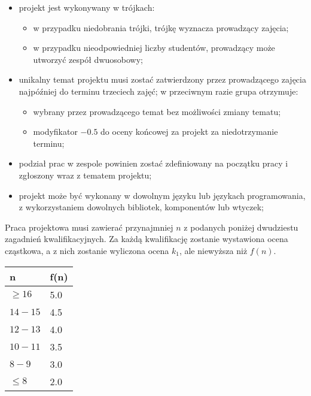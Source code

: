 \documentclass{article}
\renewcommand{\arraystretch}{1.4}
\begin{document}
	\begin{itemize}
		\item projekt jest wykonywany w trójkach:
		\begin{itemize}
			\item w przypadku niedobrania trójki, trójkę wyznacza prowadzący zajęcia;
			\item w przypadku nieodpowiedniej liczby studentów, prowadzący może utworzyć zespół dwuosobowy;
		\end{itemize}
		\item unikalny temat projektu musi zostać zatwierdzony przez prowadzącego zajęcia najpóźniej do terminu trzeciech zajęć; w przeciwnym razie grupa otrzymuje:
		\begin{itemize}
			\item wybrany przez prowadzącego temat bez możliwości zmiany tematu;
			\item modyfikator $-0.5$ do oceny końcowej za projekt za niedotrzymanie terminu;
		\end{itemize}
		\item podział prac w zespole powinien zostać zdefiniowany na początku pracy i zgłoszony wraz z tematem projektu;
		\item projekt może być wykonany w dowolnym języku lub językach programowania, z wykorzystaniem dowolnych bibliotek, komponentów lub wtyczek;
	\end{itemize}
	
	\newpage
	
	Praca projektowa musi zawierać przynajmniej $n$ z podanych poniżej dwudziestu zagadnień kwalifikacyjnych. Za każdą kwalifikację zostanie wystawiona ocena cząstkowa, a z nich zostanie wyliczona ocena $k_1$, ale niewyższa niż $f(n)$.
	
	\begin{center}
		\begin{tabularx}{.5\textwidth}{X|X}
		\textbf{n} & \textbf{ f(n) } \\ \hline
		$ \geq 16 $ &  5.0 \\ \hline
		$ 14-15 $ &  4.5 \\ \hline
		$ 12-13 $ &  4.0 \\ \hline
		$ 10-11 $ &  3.5 \\ \hline
		$ 8-9 $ &  3.0 \\ \hline
		$ \le 8 $ &  2.0 \\
		\end{tabularx}
	\end{center}
	
	\renewcommand{\arraystretch}{1.9}
	
\end{document}

